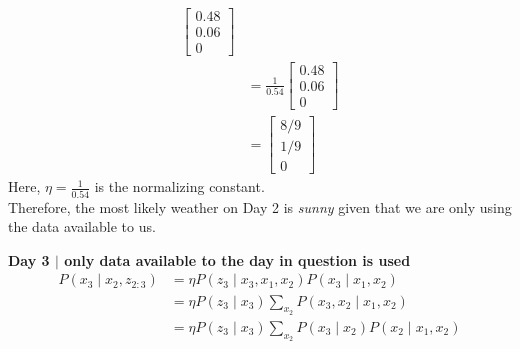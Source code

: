 \documentclass[answers]{exam}
\begin{document}
\begin{questions}
\begin{parts}
\begin{solution}
\begin{align*}
\begin{bmatrix}
                                                                                 0.48 \\
                                                                                 0.06 \\
                                                                                 0
                                                                             \end{bmatrix} \\
                                     & = \frac{1}{0.54} \begin{bmatrix}
                                                            0.48 \\
                                                            0.06 \\
                                                            0
                                                        \end{bmatrix}                      \\
                                     & = \begin{bmatrix}
                                             8/9 \\
                                             1/9 \\
                                             0
                                         \end{bmatrix}
            \end{align*}
            Here, \(\eta = \frac{1}{0.54}\) is the normalizing constant. \\
            Therefore, the most likely weather on Day 2 is \textit{sunny} given that we are only using the data available to us.

            \textbf{Day 3 $\mid$ only data available to the day in question is used}
            \begin{align*}
                P(x_3 \mid x_2, z_{2:3}) & = \eta P(z_3 \mid x_3, x_1, x_2) P(x_3 \mid x_1, x_2)                  \\
                                         & = \eta P(z_3 \mid x_3) \sum_{x_2} P(x_3, x_2 \mid x_1, x_2)            \\
                                         & = \eta P(z_3 \mid x_3) \sum_{x_2} P(x_3 \mid x_2) P(x_2 \mid x_1, x_2)
            \end{align*}


\end{solution}
\end{parts}
\end{questions}
\end{document}
